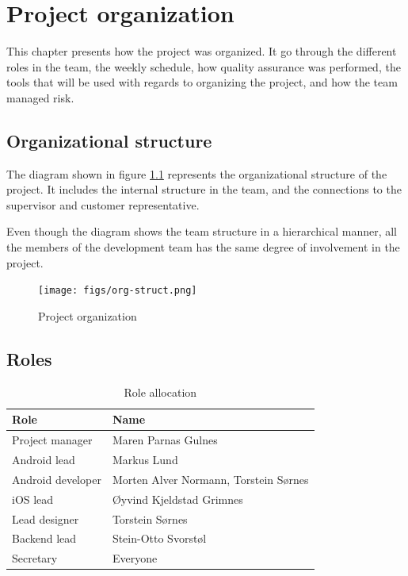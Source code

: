 \chapter{Project organization}
\label{chap:ProjectOrganization}
This chapter presents how the project was organized. It go through the different roles in the team, the weekly schedule, how quality assurance was performed, the tools that will be used with regards to organizing the project, and how the team managed risk.

\section{Organizational structure}
The diagram shown in figure \ref{fig:org-structure} represents the organizational structure of the project. It includes the internal structure in the team, and the connections to the supervisor and customer representative.

Even though the diagram shows the team structure in a hierarchical manner, all the members of the development team has the same degree of involvement in the project. 

\begin{figure}
\centering
\texttt{[image: figs/org-struct.png]}
\caption{Project organization}
\label{fig:org-structure}
\end{figure}

\newpage
\section{Roles}

\begin{table}[h]
\centering
\begin{tabular}{|l|l|}
  \hline
  \textbf{Role} & \textbf{Name} \\
  \hline
  Project manager & Maren Parnas Gulnes \\
  Android lead & Markus Lund \\
  Android developer & Morten Alver Normann, Torstein Sørnes \\
  iOS lead & Øyvind Kjeldstad Grimnes \\
  Lead designer & Torstein Sørnes \\
  Backend lead & Stein-Otto Svorstøl\\
  Secretary & Everyone \\
  \hline
\end{tabular}
\caption{Role allocation}
\label{tab:roleTable}
\end{table}{}

